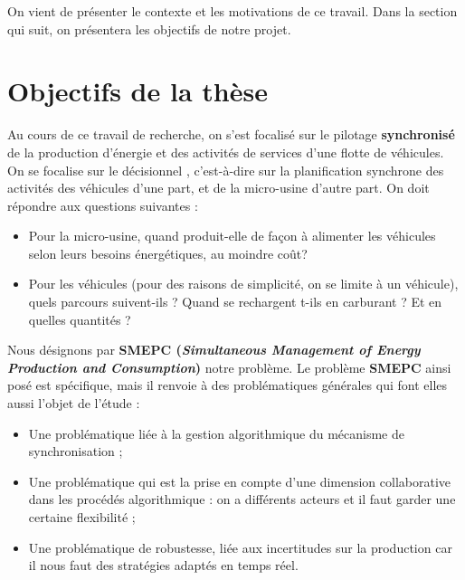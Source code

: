 
On vient de présenter le contexte et les motivations de ce travail. Dans la section qui suit, on présentera les objectifs de notre projet.
\section{Objectifs de la thèse}
Au cours de ce travail de recherche, on s'est focalisé sur le pilotage \textbf{synchronisé} de la production d'énergie et des activités de services d'une flotte de véhicules.
 On se focalise sur le \og décisionnel \fg{}, c'est-à-dire sur la planification synchrone des activités des véhicules d'une part, et de la micro-usine d'autre part. On doit répondre aux questions suivantes :
\begin{itemize}[label=$\square$]
	\item Pour la micro-usine, quand produit-elle de façon à alimenter les véhicules selon leurs besoins énergétiques, au moindre coût?
	\item Pour les véhicules (pour des raisons de simplicité, on se limite à un véhicule), quels parcours suivent-ils ? Quand se rechargent t-ils en carburant ? Et en quelles quantités ?
\end{itemize} 
Nous désignons par \textbf{SMEPC (\textit{Simultaneous Management of Energy Production and Consumption})} notre problème. Le problème \textbf{SMEPC} ainsi posé est spécifique, mais il renvoie à des problématiques générales qui font elles aussi l'objet de l'étude :
\begin{itemize}[label=$\square$]
	\item Une problématique liée à la gestion algorithmique du mécanisme de synchronisation ; %
	\item Une problématique qui est la prise en compte d'une dimension collaborative dans les procédés algorithmique : on a différents acteurs et il faut garder une certaine flexibilité ;
	\item Une problématique de robustesse, liée aux incertitudes sur la production car il nous faut des stratégies adaptés en temps réel.
\end{itemize} 
